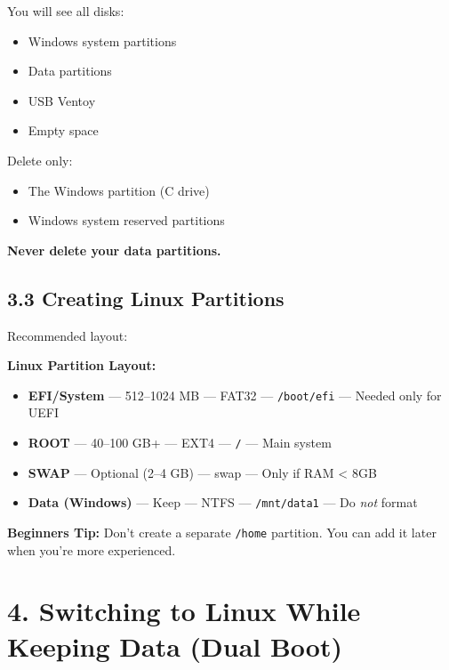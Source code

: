 \documentclass[12pt]{article}
\begin{document}
You will see all disks:

\begin{itemize}
    \item Windows system partitions
    \item Data partitions
    \item USB Ventoy
    \item Empty space
\end{itemize}

Delete only:

\begin{itemize}
    \item The Windows partition (C drive)
    \item Windows system reserved partitions
\end{itemize}

\begin{warningbox}
\textbf{Never delete your data partitions.}
\end{warningbox}

\subsection*{3.3 Creating Linux Partitions}

Recommended layout:

\begin{infobox}
\textbf{Linux Partition Layout:}
\begin{itemize}
    \item \textbf{EFI/System} — 512–1024 MB — FAT32 — \texttt{/boot/efi} — Needed only for UEFI
    \item \textbf{ROOT} — 40–100 GB+ — EXT4 — \texttt{/} — Main system
    \item \textbf{SWAP} — Optional (2–4 GB) — swap — Only if RAM < 8GB
    \item \textbf{Data (Windows)} — Keep — NTFS — \texttt{/mnt/data1} — Do \textit{not} format
\end{itemize}
\end{infobox}

\begin{infobox}
\textbf{Beginners Tip:} Don't create a separate \texttt{/home} partition. You can add it later when you're more experienced.
\end{infobox}

\section*{4. Switching to Linux While Keeping Data (Dual Boot)}
\end{document}
